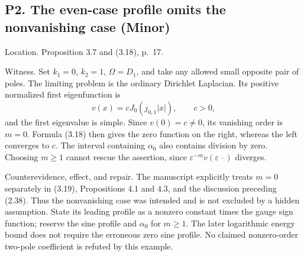 \documentclass[10pt]{article}
\begin{document}
\subsection*{P2. The even-case profile omits the nonvanishing case (Minor)}
Location. Proposition 3.7 and (3.18), p. 17.\par
Witness. Set \(k_1=0\), \(k_2=1\), \(\Omega=D_1\), and take any allowed small opposite pair of poles. The limiting problem is the ordinary Dirichlet Laplacian. Its positive normalized first eigenfunction is \[v(x)=cJ_0(j_{0,1}|x|),\qquad c>0,\] and the first eigenvalue is simple. Since \(v(0)=c\ne0\), its vanishing order is \(m=0\). Formula (3.18) then gives the zero function on the right, whereas the left converges to \(c\). The interval containing \(\alpha_0\) also contains division by zero. Choosing \(m\ge1\) cannot rescue the assertion, since \(\varepsilon^{-m}v(\varepsilon\,\cdot)\) diverges.\par
Counterevidence, effect, and repair. The manuscript explicitly treats \(m=0\) separately in (3.19), Propositions 4.1 and 4.3, and the discussion preceding (2.38). Thus the nonvanishing case was intended and is not excluded by a hidden assumption. State its leading profile as a nonzero constant times the gauge sign function; reserve the sine profile and \(\alpha_0\) for \(m\ge1\). The later logarithmic energy bound does not require the erroneous zero sine profile. No claimed nonzero-order two-pole coefficient is refuted by this example.\par
\end{document}
